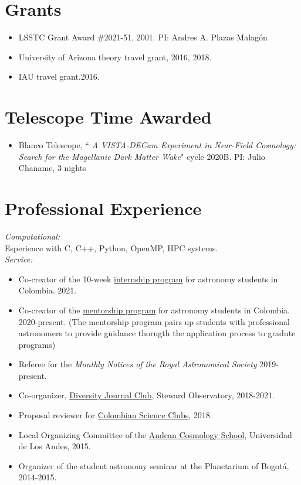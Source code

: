 \documentclass[UTF8]{article}
\begin{document}
\section*{Grants}
\begin{itemize}
\setlength\itemsep{0.0em}
\renewcommand\labelitemi{$\cdot$}
\item LSSTC Grant Award \#2021-51, 2001. PI: Andres A. Plazas Malag\'on
\item University of Arizona theory travel grant, 2016, 2018. 
\item IAU travel grant.2016.
\end{itemize}

\section*{Telescope Time Awarded}
\begin{itemize}
  \setlength\itemsep{0.0em}
  \renewcommand\labelitemi{$\cdot$}
\item Blanco Telescope, ``\textit{ A VISTA-DECam Experiment in Near-Field
  Cosmology: Search for the Magellanic Dark Matter Wake}" cycle 2020B. PI: Julio Chaname, 3 nights 
\end{itemize}

\section*{Professional Experience}
\textit{Computational:}\\
Esperience with C, C++, Python, OpenMP, HPC systems.\\

\textit{Service:} 
\begin{itemize}
  \setlength\itemsep{0.0em}
  \renewcommand\labelitemi{$\cdot$}
\item Co-creator of the 10-week  \href{https://recastronomia.github.io/internship/}{internship program} for astronomy students in Colombia. 2021.

\item Co-creator of the \href{https://recastronomia.github.io/mentores/}{mentorship program} for astronomy students in Colombia. 2020-present.
  (The mentorship program pairs up students with professional astronomers to
  provide guidance thorugth the application process to gradute programs)

\item Referee for the \textit{Monthly Notices of the Royal Astronomical Society} 2019-present.
\item Co-organizer,  \href{https://www.as.arizona.edu/diversity_coffee/}{Diversity Journal Club},
  Steward Observatory, 2018-2021.
\item Proposal reviewer for \href{https://clubesdeciencia.co/}{Colombian Science Clubs}, 2018.
\item Local Organizing Committee of the \href{http://forero.github.io/AndeanCosmologySchool/}{Andean Cosmology School}, Universidad de Los Andes, 2015.
\item Organizer of the student astronomy seminar at the Planetarium of Bogot\'a, 2014-2015.
\end{itemize}
\end{document}
